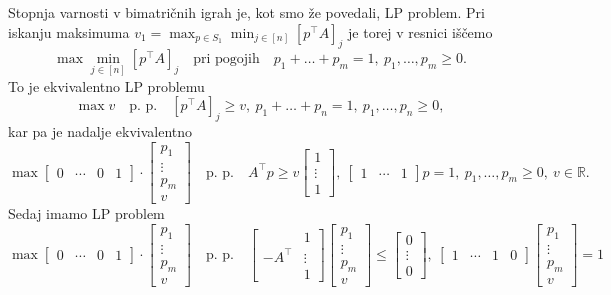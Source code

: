 \documentclass[10pt, a4paper]{article}
\newcommand{\R}{\mathbb {R}}
\begin{document}
Stopnja varnosti v bimatričnih igrah je, kot smo že povedali, LP problem.
Pri iskanju maksimuma $v_1 = \max_{p \in S_1} \min_{j \in [n]} [p^\top A]_j$ je torej
v resnici iščemo 
$$
\max \min_{j \in [n]} [p^\top A]_j \quad \textrm{pri pogojih}\quad p_1 + \dots + p_m = 1,\ p_1, \dots, p_m \geq 0.
$$
To je ekvivalentno LP problemu
$$
\max v \quad \textrm{p. p.}\quad [p^\top A]_j \geq v,\ p_1 + \dots + p_n = 1,\ p_1,\dots, p_n \geq 0,
$$
kar pa je nadalje ekvivalentno 
$$
\max \begin{bmatrix}
    0 & \cdots & 0 & 1
  \end{bmatrix} \cdot \begin{bmatrix}
    p_1\\ \vdots\\ p_m\\ v
  \end{bmatrix} \quad \textrm{p. p.}\quad A^\top p \geq v \begin{bmatrix}
    1 \\ \vdots \\ 1
  \end{bmatrix},\ \begin{bmatrix}
  1 & \cdots & 1
\end{bmatrix} p = 1,\ p_1, \dots, p_m \geq 0,\ v \in \R.
$$
Sedaj imamo LP problem 
$$\max \begin{bmatrix}
  0 & \cdots & 0 & 1
\end{bmatrix} \cdot \begin{bmatrix}
  p_1\\ \vdots\\ p_m\\ v
\end{bmatrix} \quad \textrm{p. p.}\quad
  \begin{bmatrix}
    & 1\\
    -A^\top & \vdots\\
    & 1
  \end{bmatrix} 
  \begin{bmatrix}
    p_1\\ \vdots \\ p_m\\ v
  \end{bmatrix} \leq \begin{bmatrix}
    0 \\ \vdots \\ 0
  \end{bmatrix},\
  \begin{bmatrix}
    1 & \cdots & 1 & 0
  \end{bmatrix} \begin{bmatrix}
    p_1\\ \vdots \\ p_m\\ v
  \end{bmatrix} = 1
$$
\end{document}
